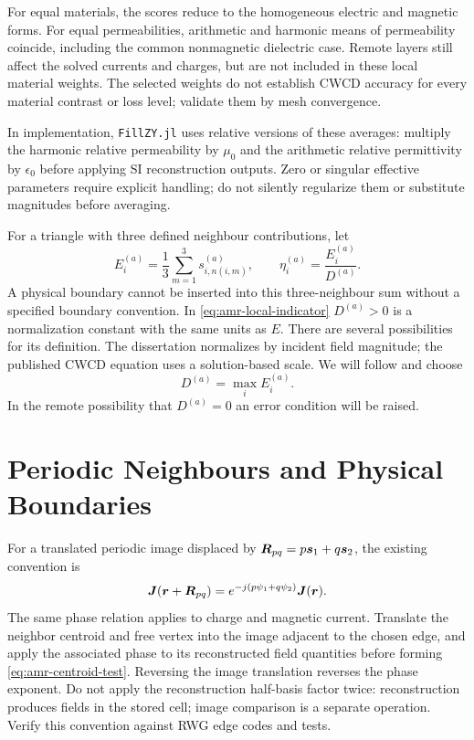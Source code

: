 For equal materials, the scores reduce to the homogeneous electric and magnetic
forms. For equal permeabilities, arithmetic and harmonic means of permeability
coincide, including the common nonmagnetic dielectric case. Remote layers still
affect the solved currents and charges, but are not included in these local
material weights. The selected weights do not establish CWCD accuracy for every
material contrast or loss level; validate them by mesh convergence.

In implementation, \texttt{FillZY.jl} uses relative versions of these averages:
multiply the harmonic relative permeability by $\mu_0$ and the arithmetic
relative permittivity by $\epsilon_0$ before applying SI reconstruction outputs.
Zero or singular effective parameters require explicit handling; do not silently
regularize them or substitute magnitudes before averaging.

For a triangle with three defined neighbour contributions, let
\begin{equation}
 E_i^{(a)}=\frac{1}{3}\sum_{m=1}^3 s_{i,n(i,m)}^{(a)},\qquad
 \eta_i^{(a)}=\frac{E_i^{(a)}}{D^{(a)}}.
 \label{eq:amr-local-indicator}
\end{equation}
A physical boundary cannot be inserted into this three-neighbour
sum without a specified boundary convention.
In \eqref{eq:amr-local-indicator} $D^{(a)}>0$ is a normalization constant with the same units as $E$.
There are several possibilities for its definition. The dissertation \cite[Eq.~(5.7)]{kim2017error}
normalizes by incident field magnitude; the published CWCD equation \cite[Eq.~(5)]{kim2018evaluation}
uses a solution-based scale. We will follow \cite{kim2018evaluation} and choose
\begin{equation}
  \label{eq:Ddef}
  D^{(a)} = \max_i E_i^{(a)}.
\end{equation}
In the remote possibility that $D^{(a)} = 0$ an error condition will be raised.


\section{Periodic Neighbours and Physical Boundaries}
For a translated periodic image displaced by
$\boldsymbol{R}_{pq} = p \boldsymbol{s}_1 + q \boldsymbol{s}_2$, the existing convention is
\begin{equation}
 \boldsymbol{J}(\boldsymbol{r} + \boldsymbol{R}_{pq}) =  e^{-j(p\psi_1+q\psi_2)} \boldsymbol{J}(\boldsymbol{r}).
 \label{eq:amr-periodic-phase}
\end{equation}
The same phase relation applies to charge and magnetic current. Translate the
neighbor centroid and free vertex into the image adjacent to the chosen edge,
and apply the associated phase to its reconstructed field quantities before
forming \eqref{eq:amr-centroid-test}. Reversing the image translation reverses
the phase exponent. Do not apply the reconstruction half-basis factor twice:
reconstruction produces fields in the stored cell; image comparison is a
separate operation. Verify this convention against RWG edge codes and tests.

